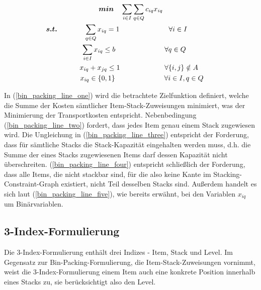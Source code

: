 \begin{gather}
\boldsymbol{min} \quad \sum_{i \in I} \sum_{q \in Q} c_{iq} x_{iq} \label{bin_packing_line_one} \\
\thinspace\thinspace \boldsymbol{s.t.} \thinspace\quad\thinspace\thinspace\thinspace\quad\thinspace \quad \sum_{q \in Q} x_{iq} = 1 \quad\quad\quad\quad\quad\quad\quad \forall i \in I \quad\quad\quad\quad\thinspace\thinspace \label{bin_packing_line_two} \\
\quad \sum_{i \in I} x_{iq} \leq b \quad\quad\quad\quad\quad\quad\quad \forall q \in Q \label{bin_packing_line_three} \\
\thinspace\thinspace\quad\quad x_{iq} + x_{jq} \leq 1 \quad\quad\thinspace\thinspace\quad\quad\quad\quad \forall \{i, j\} \notin A \label{bin_packing_line_four} \\
\thinspace\thinspace\quad\quad\quad x_{iq} \in \{0, 1\} \thinspace\thinspace\thinspace\thinspace\thinspace\thinspace\quad\quad\quad\quad\quad\quad \forall i \in I, q \in Q \thinspace \label{bin_packing_line_five}
\end{gather}

In (\ref{bin_packing_line_one}) wird die betrachtete Zielfunktion definiert, welche die Summe der Kosten sämtlicher
Item-Stack-Zuweisungen minimiert, was der Minimierung der Transportkosten entspricht.
Nebenbedingung (\ref{bin_packing_line_two}) fordert, dass jedes Item genau einem Stack zugewiesen wird. Die Ungleichung in (\ref{bin_packing_line_three}) entspricht der Forderung, dass für sämtliche Stacks die Stack-Kapazität eingehalten werden muss, d.h.
die Summe der eines Stacks zugewiesenen Items darf dessen Kapazität nicht überschreiten. (\ref{bin_packing_line_four}) entspricht schließlich der Forderung, dass alle Items, die nicht stackbar sind, für die also keine Kante im Stacking-Constraint-Graph existiert, nicht Teil desselben Stacks sind. Außerdem handelt es sich laut (\ref{bin_packing_line_five}), wie bereits erwähnt, bei den Variablen $x_{iq}$ um Binärvariablen.

\subsection{3-Index-Formulierung}
\label{sec:three_idx_formulation}

Die 3-Index-Formulierung enthält drei Indizes - Item, Stack und Level.
Im Gegensatz zur Bin-Packing-Formulierung, die Item-Stack-Zuweisungen vornimmt, weist die 3-Index-Formulierung einem
Item auch eine konkrete Position innerhalb eines Stacks zu, sie berücksichtigt also den Level.

